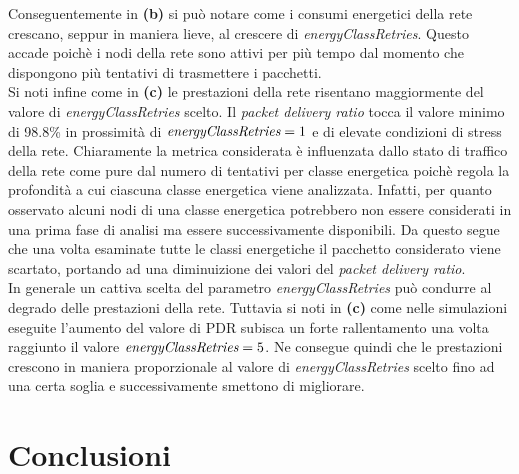 \documentclass[binding=0.6cm,TFA]{sapthesis}
\begin{document}
Conseguentemente in \textbf{(b)} si può notare come i consumi energetici della rete crescano, seppur in maniera lieve, al crescere di \emph{energyClassRetries}.
Questo accade poichè i nodi della rete sono attivi per più tempo dal momento che dispongono più tentativi di trasmettere i pacchetti.\\

Si noti infine come in \textbf{(c)} le prestazioni della rete risentano maggiormente del valore di \emph{energyClassRetries} scelto. Il \emph{packet delivery ratio}
tocca il valore minimo di 98.8\% in prossimità di $\emph{energyClassRetries}=1$ e di elevate condizioni di stress della rete. Chiaramente la metrica considerata
è influenzata dallo stato di traffico della rete come pure dal numero di tentativi per classe energetica poichè regola la profondità a cui ciascuna classe
energetica viene analizzata. Infatti, per quanto osservato alcuni nodi di una classe energetica potrebbero non essere considerati in una prima fase di analisi
ma essere successivamente disponibili. Da questo segue che una volta esaminate tutte le classi energetiche il pacchetto considerato viene scartato, portando
ad una diminuizione dei valori del \emph{packet delivery ratio}.\\

In generale un cattiva scelta del parametro \emph{energyClassRetries} può condurre al degrado delle prestazioni della rete. Tuttavia si noti in \textbf{(c)}
come nelle simulazioni eseguite l'aumento del valore di PDR subisca un forte rallentamento una volta raggiunto il valore $\emph{energyClassRetries}=5$. Ne
consegue quindi che le prestazioni crescono in maniera proporzionale al valore di \emph{energyClassRetries} scelto fino ad una certa soglia e
successivamente smettono di migliorare.

\chapter{Conclusioni}

\backmatter
\cleardoublepage
{} %
\end{document}

